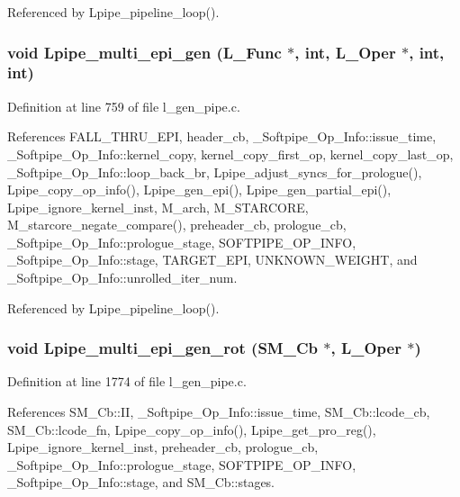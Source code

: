 Referenced by Lpipe\_\-pipeline\_\-loop().
\subsubsection{\setlength{\rightskip}{0pt plus 5cm}void Lpipe\_\-multi\_\-epi\_\-gen (L\_\-Func $\ast$, int, L\_\-Oper $\ast$, int, int)}\label{l__gen__pipe_8h_7ff3a23339ed670d134900128579db81}




Definition at line 759 of file l\_\-gen\_\-pipe.c.

References FALL\_\-THRU\_\-EPI, header\_\-cb, \_\-Softpipe\_\-Op\_\-Info::issue\_\-time, \_\-Softpipe\_\-Op\_\-Info::kernel\_\-copy, kernel\_\-copy\_\-first\_\-op, kernel\_\-copy\_\-last\_\-op, \_\-Softpipe\_\-Op\_\-Info::loop\_\-back\_\-br, Lpipe\_\-adjust\_\-syncs\_\-for\_\-prologue(), Lpipe\_\-copy\_\-op\_\-info(), Lpipe\_\-gen\_\-epi(), Lpipe\_\-gen\_\-partial\_\-epi(), Lpipe\_\-ignore\_\-kernel\_\-inst, M\_\-arch, M\_\-STARCORE, M\_\-starcore\_\-negate\_\-compare(), preheader\_\-cb, prologue\_\-cb, \_\-Softpipe\_\-Op\_\-Info::prologue\_\-stage, SOFTPIPE\_\-OP\_\-INFO, \_\-Softpipe\_\-Op\_\-Info::stage, TARGET\_\-EPI, UNKNOWN\_\-WEIGHT, and \_\-Softpipe\_\-Op\_\-Info::unrolled\_\-iter\_\-num.

Referenced by Lpipe\_\-pipeline\_\-loop().
\subsubsection{\setlength{\rightskip}{0pt plus 5cm}void Lpipe\_\-multi\_\-epi\_\-gen\_\-rot (\bf{SM\_\-Cb} $\ast$, L\_\-Oper $\ast$)}\label{l__gen__pipe_8h_3616d73f0912210bda14a73e1814421a}




Definition at line 1774 of file l\_\-gen\_\-pipe.c.

References SM\_\-Cb::II, \_\-Softpipe\_\-Op\_\-Info::issue\_\-time, SM\_\-Cb::lcode\_\-cb, SM\_\-Cb::lcode\_\-fn, Lpipe\_\-copy\_\-op\_\-info(), Lpipe\_\-get\_\-pro\_\-reg(), Lpipe\_\-ignore\_\-kernel\_\-inst, preheader\_\-cb, prologue\_\-cb, \_\-Softpipe\_\-Op\_\-Info::prologue\_\-stage, SOFTPIPE\_\-OP\_\-INFO, \_\-Softpipe\_\-Op\_\-Info::stage, and SM\_\-Cb::stages.

